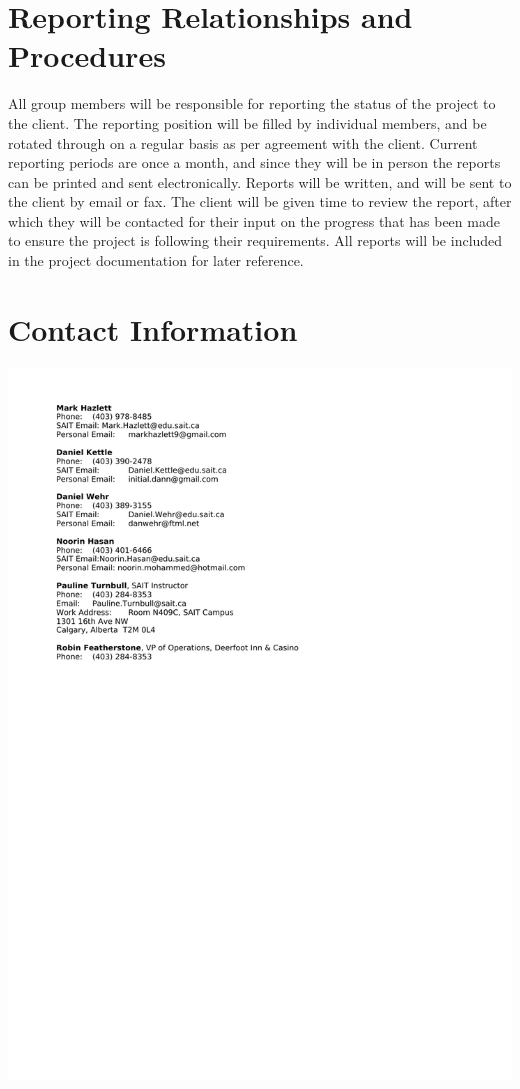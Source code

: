 \documentclass[letterpaper,12pt]{report}
\begin{document}
\section{Reporting Relationships and Procedures}
\hspace{1cm}All group members will be responsible for reporting the status of the project to the client. The reporting position will be filled by individual members, and be rotated through on a regular basis as per agreement with the client. Current reporting periods are once a month, and since they will be in person the reports can be printed and sent electronically. Reports will be written, and will be sent to the client by email or fax.  The client will be given time to review the report, after which they will be contacted for their input on the progress that has been made to ensure the project is following their requirements.  All reports will be included in the project documentation for later reference.
\pagebreak
\section{Contact Information}

\includegraphics{externals/contact.pdf}
\pagebreak
\end{document}
